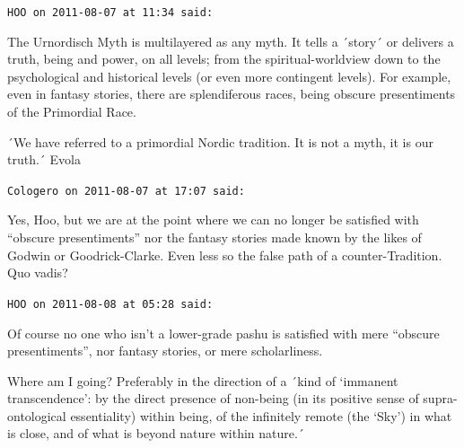 \begin{footnotesize}
\begin{sffamily}
\hfill

\texttt{HOO on 2011-08-07 at 11:34 said:}

The Urnordisch Myth is multilayered as any myth. It tells a ´story´ or delivers a truth, being and power, on all levels; from the spiritual-worldview down to the psychological and historical levels (or even more contingent levels). For example, even in fantasy stories, there are splendiferous races, being obscure presentiments of the Primordial Race.

´We have referred to a primordial Nordic tradition. It is not a myth, it is our truth.´ Evola 

\hfill

\texttt{Cologero on 2011-08-07 at 17:07 said:}

Yes, Hoo, but we are at the point where we can no longer be satisfied with ``obscure presentiments'' nor the fantasy stories made known by the likes of Godwin or Goodrick-Clarke. Even less so the false path of a counter-Tradition. Quo vadis?

\hfill

\texttt{HOO on 2011-08-08 at 05:28 said:}

Of course no one who isn't a lower-grade pashu is satisfied with mere ``obscure presentiments'', nor fantasy stories, or mere scholarliness.

Where am I going? Preferably in the direction of a ´kind of `immanent transcendence': by the direct presence of non-being (in its positive sense of supra-ontological essentiality) within being, of the infinitely remote (the `Sky') in what is close, and of what is beyond nature within nature.´


\hfill

\end{sffamily}
\end{footnotesize}

